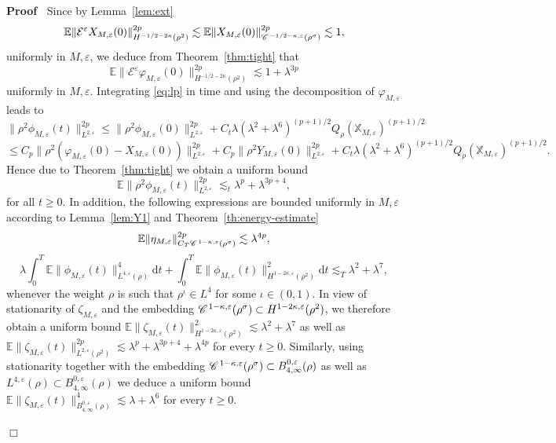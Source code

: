 \documentclass[a4paper,11pt]{article}
\newcommand{\mathd}{\mathrm{d}}
\newenvironment{proof}{\noindent\textbf{Proof\ }}{\hspace*{\fill}$\Box$\medskip}
\numberwithin{equation}{section}
\newcommand{\CC}{\mathscr{C} \hspace{.1em}}
\begin{document}
\begin{proof}
 Since by Lemma~\ref{lem:ext}
  \[ \mathbb{E} \|
     \mathcal{E}^{\varepsilon} X_{M, \varepsilon} (0) \|_{H^{- 1 / 2 - 2
     \kappa} (\rho^2)}^{2p} \lesssim 
     \mathbb{E} \| X_{M, \varepsilon} (0) \|_{\CC^{- 1 / 2 - \kappa,
     \varepsilon} (\rho^{\sigma})}^{2p} \lesssim 1, \]
     uniformly in $M,\varepsilon$,  we deduce from Theorem~\ref{thm:tight} that
   \[ 
   \mathbb{E} \|\mathcal{E}^{\varepsilon}
     \varphi_{M, \varepsilon} (0) \|_{H^{- 1 / 2 - 2
     \kappa} (\rho^2)}^{2 p} \lesssim  {1+\lambda^{3p}}  \]
 uniformly in $M,\varepsilon$.
  Integrating \eqref{eq:lp} in time and using the decomposition of $\varphi_{M,\varepsilon}$ leads to
\[ \| \rho^2 \phi_{M,\varepsilon} (t) \|_{L^{2, \varepsilon}}^{2 p} \leqslant \|
   \rho^2 \phi_{M,\varepsilon} (0) \|_{L^{2, \varepsilon}}^{2 p} + C_t \lambda (\lambda^{2}+\lambda^{6})^{(p+1)/2} Q_{\rho}
    (\mathbb{X}_{M,\varepsilon})^{(p + 1) / 2} \]
\[ \leqslant C_p \| \rho^2 (\varphi_{M,\varepsilon} (0) - X_{M,\varepsilon} (0))
    \|_{L^{2, \varepsilon}}^{2 p} + C_p \| \rho^2 Y_{M,\varepsilon} (0) \|_{L^{2,
    \varepsilon}}^{2 p} + C_t \lambda (\lambda^{2}+\lambda^{6})^{(p+1)/2} Q_{\rho} (\mathbb{X}_{M,\varepsilon})^{(p + 1) / 2}.
\]
Hence due to Theorem~\ref{thm:tight} we obtain a uniform bound 
\[
 \mathbb{E} \| \rho^2 \phi_{M,\varepsilon} (t) \|_{L^{2, \varepsilon}}^{2 p} \lesssim_t {\lambda^{p}+\lambda^{3p+4}},\]
for all $t\geqslant 0$.
In addition, the following expressions are bounded uniformly in
$M, \varepsilon$ according to Lemma~\ref{lem:Y1} and Theorem~\ref{th:energy-estimate}
\[ \mathbb{E} \| \eta_{M, \varepsilon} \|_{C_T \CC^{1 - \kappa, \varepsilon}
   (\rho^{\sigma})}^{2p} \lesssim \lambda^{{4p}},
\]
\[ \lambda \int_0^T \mathbb{E} \| \phi_{M, \varepsilon} (t)
   \|_{L^{4, \varepsilon} (\rho)}^4 \mathd t + \int_0^T \mathbb{E} \|
   \phi_{M, \varepsilon} (t) \|_{H^{1 - 2 \kappa, \varepsilon} (\rho^2)}^2
   \mathd t \lesssim_T \lambda^2 + \lambda^{7},\]
whenever the weight $\rho$ is such
that $\rho^{\iota} \in L^4$ for some $\iota \in (0, 1)$. In view of
stationarity of $\zeta_{M, \varepsilon}$ and the embedding $\CC^{1 -
\kappa, \varepsilon} (\rho^{\sigma}) \subset H^{1 - 2 \kappa, \varepsilon}
(\rho^2)$, we therefore obtain a uniform bound
$ \mathbb{E} \| \zeta_{M, \varepsilon} (t) \|_{H^{1 - 2 \kappa, \varepsilon}
   (\rho^2)}^2 \lesssim \lambda^2 + \lambda^{7}$ as well as $ \mathbb{E} \| \zeta_{M, \varepsilon} (t) \|_{L^{2,\varepsilon}
   (\rho^2)}^{2p} \lesssim {\lambda^{p}+\lambda^{3p+4}+\lambda^{4p}}$
for every $t \geqslant 0$. Similarly, using stationarity together with the
embedding $\CC^{1 - \kappa, \varepsilon} (\rho^{\sigma}) \subset B^{0,
\varepsilon}_{4, \infty} (\rho)$ as well as $L^{4, \varepsilon} (\rho) \subset
B^{0, \varepsilon}_{4, \infty}(\rho)$ we deduce a uniform bound
$\mathbb{E} \| \zeta_{M, \varepsilon} (t) \|_{B^{0, \varepsilon}_{4, \infty}
   (\rho)}^4  \lesssim {\lambda + \lambda^{6}}$
for every $t \geqslant 0$.



\end{proof}
\end{document}
